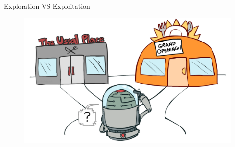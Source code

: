 \begin{frame}{Exploration VS Exploitation}
	\begin{figure}
		\centering
		\includegraphics[width=0.7\linewidth]{Images/exp_exp}
	\end{figure}
\end{frame}

